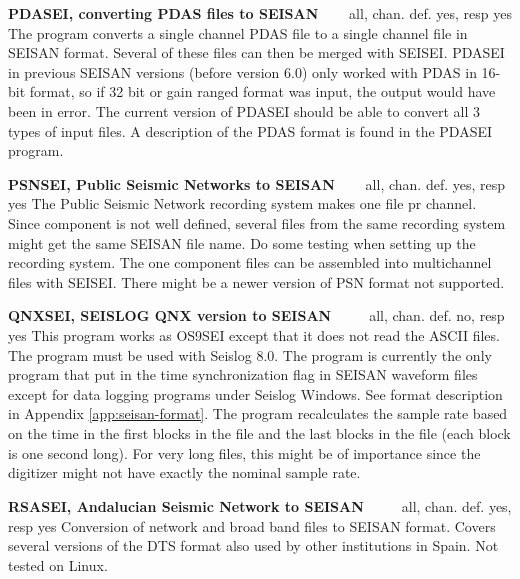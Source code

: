 \textbf{PDASEI, converting PDAS files to SEISAN} 
\verb|   |  all, chan. def. yes, resp yes \newline
{}
The program converts a single channel PDAS file to a single channel file in SEISAN format. Several of these files can then be merged with SEISEI. PDASEI in previous SEISAN versions (before version 6.0) only worked with PDAS in 16-bit format, so if 32 bit or gain ranged format was input, the output would have been in error. The current version of PDASEI should be able to convert all 3 types of input files. A description of the PDAS format is found in the PDASEI program. 

\textbf{PSNSEI, Public Seismic Networks to SEISAN} \verb|   | all, chan. def. yes, resp yes 
\newline {} The Public Seismic Network recording system makes one file pr channel. Since component is not well defined, several files from the same recording system might get the same SEISAN file name. Do some testing when setting up the recording system. The one component files can be assembled into multichannel files with SEISEI. There might be a newer version of PSN format not supported. 

\textbf{QNXSEI, SEISLOG QNX version to SEISAN} \verb|    | all, chan. def. no, resp yes \newline
{}This program works as 
OS9SEI except that it does not read the ASCII files. The program must 
be used with Seislog 8.0. The program is currently the only program 
that put in the time synchronization flag in SEISAN waveform files 
except for data logging programs under Seislog Windows. See format 
description in Appendix \ref{app:seisan-format}. The program recalculates 
the sample rate based on the time in the first blocks in the file 
and the last blocks in the file (each block is one second long). 
For very long files, this might be of importance since the digitizer might not 
have exactly the nominal sample rate. 

\textbf{RSASEI, Andalucian Seismic Network to SEISAN} \verb|    | all, chan. def. yes, resp yes \newline
Conversion of network and broad band files to SEISAN format. Covers several versions of the DTS format also used by other institutions in Spain. Not tested on Linux. 

